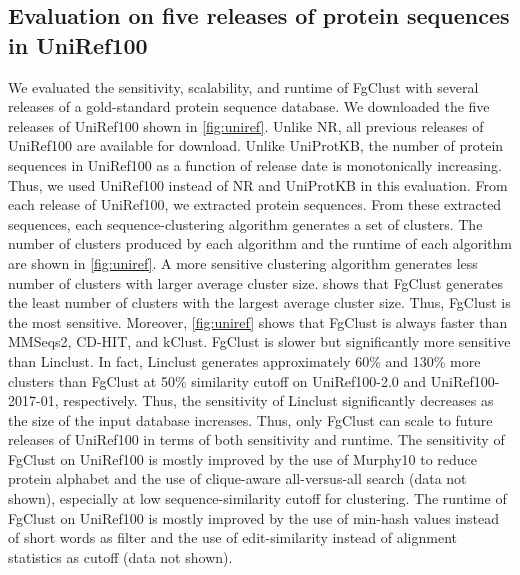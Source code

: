 \documentclass[11pt,letterpaper]{article}
\begin{document}
\subsection{Evaluation on five releases of protein sequences in UniRef100}

We evaluated the sensitivity, scalability, and runtime of FgClust with several releases of a gold-standard protein sequence database.
We downloaded the five releases of UniRef100 \citep{suzek2007uniref} shown in \cref{fig:uniref}.
Unlike NR, all previous releases of UniRef100 are available for download.
Unlike UniProtKB, the number of protein sequences in UniRef100 as a function of release date is monotonically increasing.
Thus, we used UniRef100 instead of NR and UniProtKB in this evaluation.
From each release of UniRef100, we extracted protein sequences.
From these extracted sequences, each sequence-clustering algorithm generates a set of clusters.
The number of clusters produced by each algorithm and the runtime of each algorithm are shown in \cref{fig:uniref}.
A more sensitive clustering algorithm generates less number of clusters with larger average cluster size.
 shows that FgClust generates the least number of clusters with the largest average cluster size.
Thus, FgClust is the most sensitive.
Moreover, \cref{fig:uniref} shows that FgClust is always faster than MMSeqs2, CD-HIT, and kClust.
FgClust is slower but significantly more sensitive than Linclust.
In fact, Linclust generates approximately 60\% and 130\% more clusters than FgClust at 50\% similarity cutoff on UniRef100-2.0 and UniRef100-2017-01, respectively.
Thus, the sensitivity of Linclust significantly decreases as the size of the input database increases. 
Thus, only FgClust can scale to future releases of UniRef100 in terms of both sensitivity and runtime.
The sensitivity of FgClust on UniRef100 
is mostly improved by the use of Murphy10 to reduce protein alphabet and the use of clique-aware all-versus-all search (data not shown), especially at low sequence-similarity cutoff for clustering.
The runtime of FgClust on UniRef100 is mostly improved by the use of min-hash values instead of short words as filter and the use of edit-similarity instead of alignment statistics as cutoff (data not shown).
\end{document}
